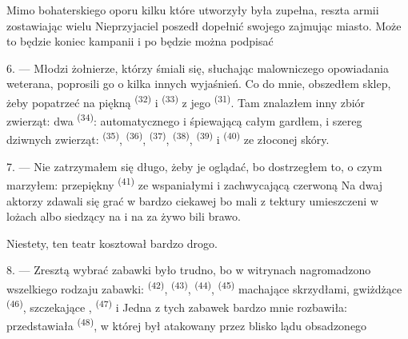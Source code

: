 Mimo bohaterskiego oporu kilku  które utworzyły 
 była zupełna, reszta armii  zostawiając wielu
 Nieprzyjaciel poszedł dopełnić swojego  zajmując
miasto. Może to będzie koniec kampanii i po  będzie można podpisać

\VUsaut{4.4mm}
\VUsaut{2.8mm}

6. --- Młodzi żołnierze, którzy śmiali się, słuchając malowniczego opowiadania weterana,
poprosili go o kilka innych wyjaśnień. Co do mnie, obszedłem sklep, żeby popatrzeć na
piękną  \textsuperscript{(32)} i  \textsuperscript{(33)} z jego
 \textsuperscript{(31)}. Tam znalazłem inny zbiór zwierząt: dwa
 \textsuperscript{(34)}: automatycznego  i
 śpiewającą całym gardłem, i szereg dziwnych zwierząt:
 \textsuperscript{(35)},  \textsuperscript{(36)},
 \textsuperscript{(37)},  \textsuperscript{(38)},
 \textsuperscript{(39)} i  \textsuperscript{(40)} ze
złoconej skóry.

7. --- Nie zatrzymałem się długo, żeby je oglądać, bo dostrzegłem to, o czym marzyłem:
przepiękny  \textsuperscript{(41)} ze wspaniałymi
 i zachwycającą czerwoną  Na  dwaj
aktorzy zdawali się grać  w bardzo ciekawej  bo
mali  z tektury umieszczeni w lożach albo siedzący na 
i na  za  żywo bili brawo.

Niestety, ten teatr kosztował bardzo drogo.

8. --- Zresztą wybrać zabawki było trudno, bo w witrynach nagromadzono wszelkiego
rodzaju zabawki:  \textsuperscript{(42)}, 
\textsuperscript{(43)},  \textsuperscript{(44)}, 
\textsuperscript{(45)} machające skrzydłami, gwiżdżące 
\textsuperscript{(46)}, szczekające , 
\textsuperscript{(47)} i  Jedna z tych zabawek bardzo mnie
rozbawiła: przedstawiała  \textsuperscript{(48)}, w której
 był atakowany przez  blisko lądu obsadzonego

